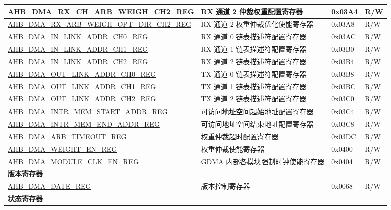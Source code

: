 \begin{longtable}{ | p{8cm} | p{8cm} | p{1.3cm} | p{1.5cm} | }
\hyperref[regdesc:AHBDMARXCHARBWEIGHCHNREG]{AHB\_DMA\_RX\_CH\_ARB\_WEIGH\_CH2\_REG} & RX 通道 2 仲裁权重配置寄存器 & 0x03A4 & R/W \\ \hline
\hyperref[regdesc:AHBDMARXARBWEIGHOPTDIRCHNREG]{AHB\_DMA\_RX\_ARB\_WEIGH\_OPT\_DIR\_CH2\_REG} & RX 通道 2 权重仲裁优化使能寄存器 & 0x03A8 & R/W \\ \hline
\hyperref[regdesc:AHBDMAINLINKADDRCHNREG]{AHB\_DMA\_IN\_LINK\_ADDR\_CH0\_REG} & RX 通道 0 链表描述符配置寄存器 & 0x03AC & R/W \\ \hline
\hyperref[regdesc:AHBDMAINLINKADDRCHNREG]{AHB\_DMA\_IN\_LINK\_ADDR\_CH1\_REG} & RX 通道 1 链表描述符配置寄存器 & 0x03B0 & R/W \\ \hline
\hyperref[regdesc:AHBDMAINLINKADDRCHNREG]{AHB\_DMA\_IN\_LINK\_ADDR\_CH2\_REG} & RX 通道 2 链表描述符配置寄存器 & 0x03B4 & R/W \\ \hline
\hyperref[regdesc:AHBDMAOUTLINKADDRCHNREG]{AHB\_DMA\_OUT\_LINK\_ADDR\_CH0\_REG} & TX 通道 0 链表描述符配置寄存器 & 0x03B8 & R/W \\ \hline
\hyperref[regdesc:AHBDMAOUTLINKADDRCHNREG]{AHB\_DMA\_OUT\_LINK\_ADDR\_CH1\_REG} & TX 通道 1 链表描述符配置寄存器 & 0x03BC & R/W \\ \hline
\hyperref[regdesc:AHBDMAOUTLINKADDRCHNREG]{AHB\_DMA\_OUT\_LINK\_ADDR\_CH2\_REG} & TX 通道 2 链表描述符配置寄存器 & 0x03C0 & R/W \\ \hline
\hyperref[regdesc:AHBDMAINTRMEMSTARTADDRREG]{AHB\_DMA\_INTR\_MEM\_START\_ADDR\_REG} & 可访问地址空间起始地址配置寄存器 & 0x03C4 & R/W \\ \hline
\hyperref[regdesc:AHBDMAINTRMEMENDADDRREG]{AHB\_DMA\_INTR\_MEM\_END\_ADDR\_REG} & 可访问地址空间结束地址配置寄存器 & 0x03C8 & R/W \\ \hline
\hyperref[regdesc:AHBDMAARBTIMEOUTREG]{AHB\_DMA\_ARB\_TIMEOUT\_REG} & 权重仲裁超时配置寄存器 & 0x03DC & R/W \\ \hline
\hyperref[regdesc:AHBDMAWEIGHTENREG]{AHB\_DMA\_WEIGHT\_EN\_REG} & 权重仲裁使能寄存器 & 0x0400 & R/W \\ \hline
\hyperref[regdesc:AHBDMAMODULECLKENREG]{AHB\_DMA\_MODULE\_CLK\_EN\_REG} & GDMA 内部各模块强制时钟使能寄存器 & 0x0404 & R/W \\ \hline
\multicolumn{4}{|l|}{\textbf{版本寄存器}} \\ \hline
\hyperref[regdesc:AHBDMADATEREG]{AHB\_DMA\_DATE\_REG} & 版本控制寄存器 & 0x0068 & R/W \\ \hline
\multicolumn{4}{|l|}{\textbf{状态寄存器}} \\ \hline

\end{longtable}
